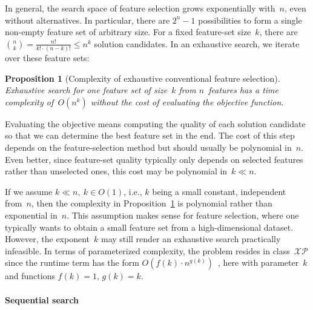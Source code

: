 \documentclass{article}
\newtheorem{proposition}{Proposition}
\theoremstyle{definition}
\begin{document}
In general, the search space of feature selection grows exponentially with~$n$, even without alternatives.
In particular, there are $2^n - 1$ possibilities to form a single non-empty feature set of arbitrary size.
For a fixed feature-set size~$k$, there are $\binom{n}{k} = \frac{n!}{k! \cdot (n-k)!} \leq n^k$ solution candidates.
In an exhaustive search, we iterate over these feature sets:
%
\begin{proposition}[Complexity of exhaustive conventional feature selection]
	Exhaustive search for one feature set of size~$k$ from $n$~features has a time complexity of~$O(n^k)$ without the cost of evaluating the objective function.
	\label{prop:afs:complexity-exhaustive-conventional}
\end{proposition}
%
Evaluating the objective means computing the quality of each solution candidate so that we can determine the best feature set in the end.
The cost of this step depends on the feature-selection method but should usually be polynomial in~$n$.
Even better, since feature-set quality typically only depends on selected features rather than unselected ones, this cost may be polynomial in~$k \ll n$.

If we assume $k \ll n,~k \in O(1)$, i.e., $k$ being a small constant, independent from~$n$, then the complexity in Proposition~\ref{prop:afs:complexity-exhaustive-conventional} is polynomial rather than exponential in~$n$.
This assumption makes sense for feature selection, where one typically wants to obtain a small feature set from a high-dimensional dataset.
However, the exponent~$k$ may still render an exhaustive search practically infeasible.
In terms of parameterized complexity, the problem resides in class~$\mathcal{XP}$ since the runtime term has the form $O(f(k) \cdot n^{g(k)})$~\cite{downey1997parameterized}, here with parameter~$k$ and functions $f(k) = 1$, $g(k) = k$.

\paragraph{Sequential search}
\end{document}
